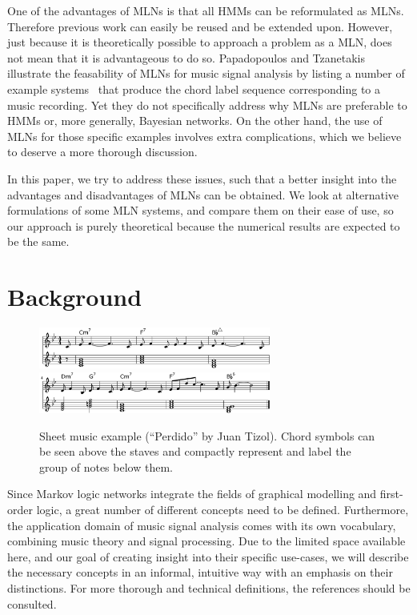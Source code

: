\documentclass[letterpaper]{article} %
\begin{document}
One of the advantages of MLNs is that all HMMs can be reformulated as MLNs. Therefore previous work can easily be reused and be extended upon. However, just because it is theoretically possible to approach a problem as a MLN, does not mean that it is advantageous to do so. Papadopoulos and Tzanetakis illustrate the feasability of MLNs for music signal analysis by listing a number of example systems~\cite{papadopoulos2012ismir,papadopoulos2013icassp,papadopoulos2017taslp} that produce the chord label sequence corresponding to a music recording. Yet they do not specifically address why MLNs are preferable to HMMs or, more generally, Bayesian networks. On the other hand, the use of MLNs for those specific examples involves extra complications, which we believe to deserve a more thorough discussion.

In this paper, we try to address these issues, such that a better insight into the advantages and disadvantages of MLNs can be obtained. We look at alternative formulations of some MLN systems, and compare them on their ease of use, so our approach is purely theoretical because the numerical results are expected to be the same.

\section{Background}

\begin{figure}[t]
\centering
\includegraphics[width=0.68\textwidth]{perdido1}
\includegraphics[width=0.68\textwidth]{perdido2}
\caption{Sheet music example (``Perdido'' by Juan Tizol). Chord symbols can be seen above the staves and compactly represent and label the group of notes below them.\label{fig:sheet-music}}
\end{figure}

Since Markov logic networks integrate the fields of graphical modelling and first-order logic, a great number of different concepts need to be defined. Furthermore, the application domain of music signal analysis comes with its own vocabulary, combining music theory and signal processing. Due to the limited space available here, and our goal of creating insight into their specific use-cases, we will describe the necessary concepts in an informal, intuitive way with an emphasis on their distinctions. For more thorough and technical definitions, the references should be consulted.
\end{document}
